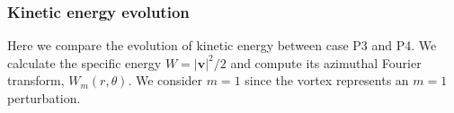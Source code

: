 \subsubsection{Kinetic energy evolution}
Here we compare the evolution of kinetic energy between case P3 and
P4. We calculate the specific energy $W=|\bm{v}|^2/2$ and compute its
azimuthal Fourier transform, $W_m(r,\theta)$. We consider $m=1$ since 
the vortex represents an $m=1$ perturbation.  
